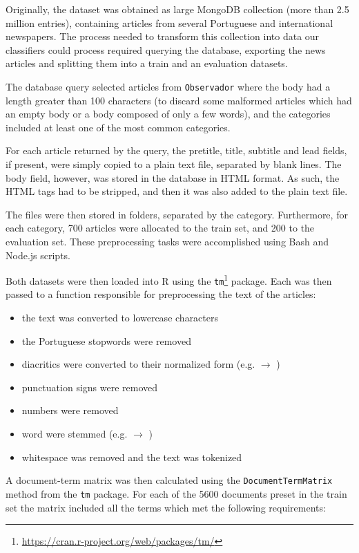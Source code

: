 \documentclass[conference]{IEEEtran}
\begin{document}
Originally, the dataset was obtained as large MongoDB collection (more
than 2.5 million entries), containing articles from several Portuguese
and international newspapers. The process needed to transform this
collection into data our classifiers could process required querying
the database, exporting the news articles and splitting them into a
train and an evaluation datasets.

The database query selected articles from \texttt{Observador} where
the body had a length greater than 100 characters (to
discard some malformed articles which had an empty body or a body
composed of only a few words), and the categories included at least
one of the most common categories.

For each article returned by the query, the pretitle, title, subtitle
and lead fields, if present, were simply copied to a plain text file,
separated by blank lines. The body field, however, was stored in the
database in HTML format. As such, the HTML tags had to be stripped,
and then it was also added to the plain text file.

The files were then stored in folders, separated by the category.
Furthermore, for each category, 700 articles were allocated to the
train set, and 200 to the evaluation set. These preprocessing tasks
were accomplished using Bash and Node.js scripts.

Both datasets were then loaded into R using the
\texttt{tm}\footnote{\url{https://cran.r-project.org/web/packages/tm/}}
package. Each was then passed to a function responsible for
preprocessing the text of the articles:

\begin{itemize}
    \item the text was converted to lowercase characters
    \item the Portuguese stopwords were removed
    \item diacritics were converted to their normalized form (e.g.
         $\rightarrow$ )
    \item punctuation signs were removed
    \item numbers were removed
    \item word were stemmed (e.g.  $\rightarrow$
        )
    \item whitespace was removed and the text was tokenized
\end{itemize}

A document-term matrix was then calculated using the
\texttt{DocumentTermMatrix} method from the \texttt{tm} package.
For each of the 5600 documents preset in the train set the matrix
included all the terms which met the following requirements:
\end{document}
